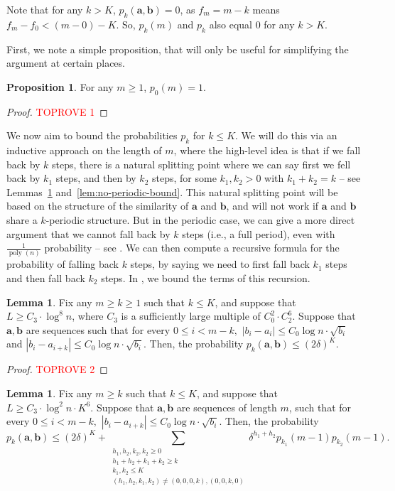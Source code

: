\documentclass[12pt]{article}
\theoremstyle{definition}
\newtheorem{proposition}[theorem]{Proposition}
\newtheorem{lemma}[theorem]{Lemma}
\theoremstyle{remark}
\DeclareMathOperator*{\poly}{poly}
\newcommand{\ba}{\mathbf a}
\newcommand{\bb}{\mathbf b}
\begin{document}
Note that for any $k > K$, $p_k(\ba, \bb) = 0$, as $f_m 
= m-k$ means $f_m - f_0 < (m-0) - K$. So, $p_k(m)$ and $p_k$ also equal $0$ for any $k > K$.


First, we note a simple proposition, that will only be useful for simplifying the argument at certain places.

\begin{proposition} \label{prop:p0-equals-1}
    For any $m \ge 1$, $p_0(m) = 1$.
\end{proposition}

\begin{proof}\textcolor{red}{TOPROVE 1}\end{proof}

We now aim to bound the probabilities $p_k$ for $k \le K$. We will do this via an inductive approach on the length of $m$, where the high-level idea is that if we fall back by $k$ steps, there is a natural splitting point where we can say first we fell back by $k_1$ steps, and then by $k_2$ steps, for some $k_1, k_2 > 0$ with $k_1+k_2 = k$ -- see Lemmas~\ref{lem:half-periodic-bound} and~\ref{lem:no-periodic-bound}. This natural splitting point will be based on the structure of the similarity of $\ba$ and $\bb$, and will not work if $\ba$ and $\bb$ share a $k$-periodic structure. But in the periodic case, we can give a more direct argument that we cannot fall back by $k$ steps (i.e., a full period), even with $\frac{1}{\poly(n)}$ probability -- see . We can then compute a recursive formula for the probability of falling back $k$ steps, by saying we need to first fall back $k_1$ steps and then fall back $k_2$ steps. In , we bound the terms of this recursion.

\begin{lemma} \label{lem:periodic-bound}
    Fix any $m \ge k \ge 1$ such that $k \le K$, and suppose that $L \ge C_3 \cdot \log^8 n$, where $C_3$ is a sufficiently large multiple of $C_0^2 \cdot C_2^6$. Suppose that $\ba, \bb$ are sequences such that for every $0 \le i < m-k,$ $|b_i-a_i| \le C_0 \log n \cdot \sqrt{b_i}$ and $|b_i-a_{i+k}| \le C_0 \log n \cdot \sqrt{b_i}$. Then, the probability $p_k(\ba, \bb) \le (2\delta)^{K}$.
\end{lemma}

\begin{proof}\textcolor{red}{TOPROVE 2}\end{proof}

\begin{lemma} \label{lem:half-periodic-bound}
    Fix any $m \ge k$ such that $k \le K$, and suppose that $L \ge C_3 \cdot \log^2 n \cdot K^6$. Suppose that $\ba, \bb$ are sequences of length $m$, such that for every $0 \le i < m-k,$ $|b_i-a_{i+k}| \le C_0 \log n \cdot \sqrt{b_i}$.
    Then, the probability
\[p_k(\ba, \bb) \le (2\delta)^{K} + \sum_{\substack{h_1, h_2, k_2, k_2 \ge 0 \\ h_1+h_2+k_1+k_2 \ge k \\ k_1, k_2 \le K \\ (h_1, h_2, k_1, k_2) \neq (0, 0, 0, k), (0, 0, k, 0)}} \delta^{h_1+h_2} p_{k_1}(m-1) p_{k_2}(m-1).\]
\end{lemma}
\end{document}
